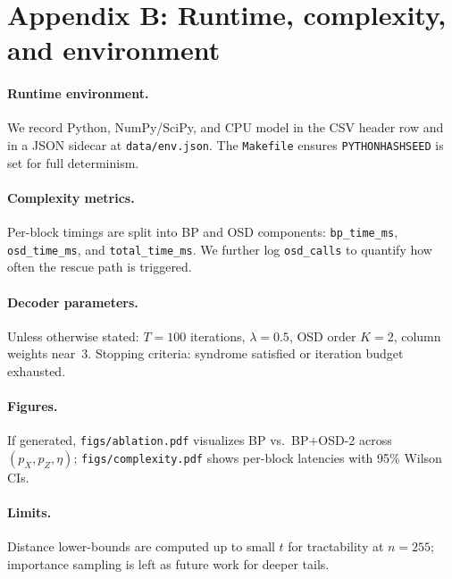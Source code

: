 \section*{Appendix B: Runtime, complexity, and environment}

\paragraph{Runtime environment.}
We record Python, NumPy/SciPy, and CPU model in the CSV header row and in a JSON sidecar at \texttt{data/env.json}. The \texttt{Makefile} ensures \texttt{PYTHONHASHSEED} is set for full determinism.

\paragraph{Complexity metrics.}
Per-block timings are split into BP and OSD components: \texttt{bp\_time\_ms}, \texttt{osd\_time\_ms}, and \texttt{total\_time\_ms}. We further log \texttt{osd\_calls} to quantify how often the rescue path is triggered.

\paragraph{Decoder parameters.}
Unless otherwise stated: $T=100$ iterations, $\lambda=0.5$, OSD order $K=2$, column weights near~3. Stopping criteria: syndrome satisfied or iteration budget exhausted.

\paragraph{Figures.}
If generated, \texttt{figs/ablation.pdf} visualizes BP vs.\ BP+OSD-2 across $(p_X,p_Z,\eta)$; \texttt{figs/complexity.pdf} shows per-block latencies with 95\% Wilson CIs.

\paragraph{Limits.}
Distance lower-bounds are computed up to small $t$ for tractability at $n=255$; importance sampling is left as future work for deeper tails.

